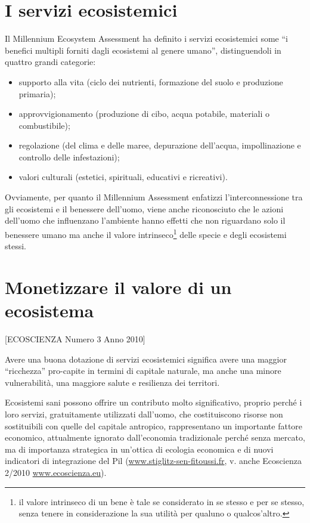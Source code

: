 \documentclass[12pt,a4paper]{article}
\begin{document}
	\section{I servizi ecosistemici}
		Il Millennium Ecosystem Assessment\cite{MEA_EcosystemsAndHumanWellBeing:Synthesis} ha definito i servizi ecosistemici some ``i benefici multipli forniti dagli ecosistemi al genere umano'', distinguendoli in quattro grandi categorie:
		\begin{itemize}
			\item supporto alla vita (ciclo dei nutrienti, formazione del suolo e produzione primaria);
			\item approvvigionamento (produzione di cibo, acqua potabile, materiali o combustibile);
			\item regolazione (del clima e delle maree, depurazione dell'acqua, impollinazione e controllo delle infestazioni);
			\item valori culturali (estetici, spirituali, educativi e ricreativi).
		\end{itemize}
		Ovviamente, per quanto il Millennium Assessment enfatizzi l'interconnessione tra gli ecosistemi e il benessere dell'uomo, viene anche riconosciuto che le azioni dell'uomo che influenzano l'ambiente hanno effetti che non riguardano solo il benessere umano ma anche il valore intrinseco\footnote{ il valore intrinseco di un bene è tale se considerato in se stesso e per se stesso, senza tenere in considerazione la sua utilità per qualuno o qualcos'altro.	} delle specie e degli ecosistemi stessi.
	
	\section{Monetizzare il valore di un ecosistema}

	[ECOSCIENZA Numero 3 Anno 2010]
	
	
	Avere una buona dotazione di servizi ecosistemici significa avere una maggior ``ricchezza'' pro-capite in termini di capitale naturale, ma anche una minore  vulnerabilità, una maggiore salute e resilienza dei territori.
	
	Ecosistemi sani possono offrire un contributo molto significativo, proprio perché i loro servizi, gratuitamente utilizzati dall'uomo, che costituiscono risorse non sostituibili con quelle del capitale antropico, rappresentano un importante fattore economico, attualmente ignorato dall'economia tradizionale perché senza mercato, ma di importanza strategica in un'ottica di ecologia economica e di nuovi indicatori di integrazione del Pil (\url{www.stiglitz-sen-fitoussi.fr}, v. anche Ecoscienza 2/2010 \url{www.ecoscienza.eu}).
	
\end{document}
